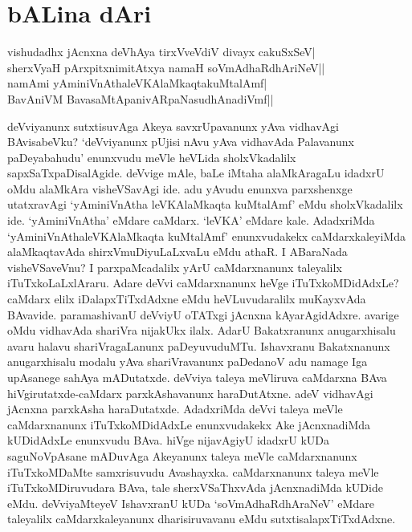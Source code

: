\chapter{bALina dAri}\label{chap1}


\begin{shloka}
vishudadhx jAcnxna deVhAya tirxVveVdiV divayx cakuSxSeV|\\
sherxVyaH pArxpitxnimitAtxya namaH soVmAdhaRdhAriNeV||\\
namAmi yAminiVnAthaleVKAlaMkaqtakuMtalAmf|\\
BavAniVM BavasaMtApanivARpaNasudhAnadiVmf||
\end{shloka}

deVviyanunx sutxtisuvAga Akeya savxrUpavanunx yAva vidhavAgi BAvisabeVku? `deVviyanunx pUjisi nAvu yAva 
vidhavAda Palavanunx paDeyabahudu' enunxvudu meVle heVLida sholxVkadalilx sapxSaTxpaDisalAgide. deVvige 
mAle, baLe iMtaha alaMkAragaLu idadxrU oMdu alaMkAra visheVSavAgi ide. adu yAvudu enunxva parxshenxge 
utatxravAgi `yAminiVnAtha leVKAlaMkaqta kuMtalAmf' eMdu sholxVkadalilx ide. `yAminiVnAtha' 
eMdare caMdarx. `leVKA' eMdare kale. AdadxriMda `yAminiVnAthaleVKAlaMkaqta kuMtalAmf' enunxvudakekx 
caMdarxkaleyiMda alaMkaqtavAda shirxVmuDiyuLaLxvaLu eMdu athaR. I ABaraNada visheVSaveVnu? I 
parxpaMcadalilx yArU caMdarxnanunx taleyalilx iTuTxkoLaLxlAraru. Adare deVvi caMdarxnanunx heVge iTuTxkoMDidAdxLe? caMdarx 
elilx iDalapxTiTxdAdxne eMdu heVLuvudaralilx muKayxvAda BAvavide. paramashivanU deVviyU oTATxgi 
jAcnxna kAyarAgidAdxre. avarige oMdu vidhavAda shariVra nijakUkx ilalx. AdarU Bakatxranunx anugarxhisalu 
avaru halavu shariVragaLanunx paDeyuvuduMTu. Ishavxranu Bakatxnanunx anugarxhisalu modalu yAva shariVravanunx 
paDedanoV adu namage Iga upAsanege sahAya mADutatxde. deVviya taleya meVliruva caMdarxna 
BAva hiVgirutatxde-caMdarx parxkAshavanunx haraDutAtxne. adeV vidhavAgi jAcnxna parxkAsha haraDutatxde. AdadxriMda deVvi 
taleya meVle caMdarxnanunx iTuTxkoMDidAdxLe enunxvudakekx Ake jAcnxnadiMda kUDidAdxLe enunxvudu BAva. hiVge 
nijavAgiyU idadxrU kUDa saguNoVpAsane mADuvAga Akeyanunx taleya meVle caMdarxnanunx iTuTxkoMDaMte 
samxrisuvudu Avashayxka. caMdarxnanunx taleya meVle iTuTxkoMDiruvudara BAva, tale sherxVSaThxvAda jAcnxnadiMda 
kUDide eMdu. deVviyaMteyeV IshavxranU kUDa `soVmAdhaRdhAraNeV' eMdare taleyalilx caMdarxkaleyanunx dharisiruvavanu eMdu sutxtisalapxTiTxdAdxne.

